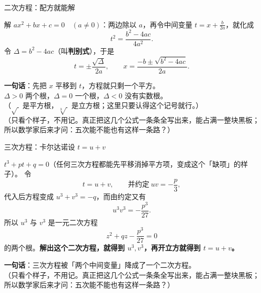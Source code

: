 \documentclass[10pt]{beamer}
\begin{document}
\begin{frame}{二次方程：配方就能解}
  \small
  \setlength{\abovedisplayskip}{1pt plus 1pt}
  \setlength{\belowdisplayskip}{1pt plus 1pt}
  \setlength{\abovedisplayshortskip}{1pt}
  \setlength{\belowdisplayshortskip}{1pt}
  \begin{example}[一元二次方程]
    解 \(ax^2+bx+c=0\quad(a\neq0)\)：两边除以 \(a\)，再令中间变量
    \(t=x+\frac{b}{2a}\)，就化成
    \[ t^2=\frac{b^2-4ac}{4a^2}. \]
    令 \(\Delta=b^2-4ac\)（叫\textbf{判别式}），于是
    \[ t=\pm\frac{\sqrt{\Delta}}{2a},\qquad x=\frac{-b\pm\sqrt{b^2-4ac}}{2a}. \]
  \end{example}
  \begin{center}
    \small\textbf{一句话}：先把 \(x\) 平移到 \(t\)，方程就只剩一个平方。\\
    \small \(\Delta>0\) 两个根，\(\Delta=0\) 一个根，\(\Delta<0\) 没有实数根。\\
    \scriptsize（\(\sqrt{\ }\) 是平方根，\(\sqrt[3]{\ }\) 是立方根；这里只要认得这个记号就行。）\\
    \scriptsize（只看个样子，不用记。真正把这几个公式一条条全写出来，能占满一整块黑板；所以数学家后来才问：五次能不能也有这样一条路？）
  \end{center}
\end{frame}

\begin{frame}{三次方程：卡尔达诺设 \(t=u+v\)}
  \small
  \setlength{\abovedisplayskip}{1pt plus 1pt}
  \setlength{\belowdisplayskip}{1pt plus 1pt}
  \setlength{\abovedisplayshortskip}{1pt}
  \setlength{\belowdisplayshortskip}{1pt}
  \begin{example}[一元三次方程]
    \(t^3+pt+q=0\)（任何三次方程都能先平移消掉平方项，变成这个「缺项」的样子）。
    令
    \[ t=u+v,\qquad\text{并约定}\ uv=-\frac{p}{3}, \]
    代入后方程变成 \(u^3+v^3=-q\)，而由约定又有
    \[ u^3v^3=-\frac{p^3}{27}. \]
    所以 \(u^3\) 与 \(v^3\) 是一元二次方程
    \[ z^2+qz-\frac{p^3}{27}=0 \]
    的两个根。\textbf{解出这个二次方程，就得到 \(u^3,v^3\)，再开立方就得到 \(t=u+v\)。}
  \end{example}
  \begin{center}
    \small\textbf{一句话}：三次方程被「两个中间变量」降成了一个二次方程。\\
    \scriptsize（只看个样子，不用记。真正把这几个公式一条条全写出来，能占满一整块黑板；所以数学家后来才问：五次能不能也有这样一条路？）
  \end{center}
\end{frame}
\end{document}
